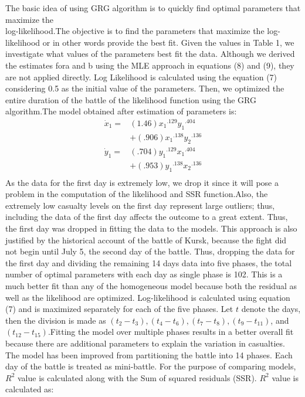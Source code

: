 \documentclass[]{article}
\begin{document}
The basic idea of using GRG algorithm is to quickly find optimal parameters that maximize the \\log-likelihood.The objective is to find the parameters that maximize the log-likelihood or in other words provide the best fit. Given the values in Table 1, we investigate what values of the parameters best fit the data. Although we derived the estimates fora and b using the MLE approach in equations (8) and (9), they are not applied directly. Log Likelihood is calculated using the equation (7) considering 0.5 as the initial value of the parameters. Then, we optimized the entire duration of the battle of the likelihood function using the GRG algorithm.The model obtained after estimation of parameters is:
\begin{equation}
\begin{split}
    \Dot{x}_1=&(1.46){x_1}^{.129}{y_1}^{.404} \\
     &+(.906){x_1}^{.138}{y_2}^{.136} \\
     \Dot{y}_1=&(.704){y_1}^{.129}{x_1}^{.404}\\
      &+(.953){y_1}^{.138}{x_2}^{.136}\\
\end{split}
\end{equation}
As the data for the first day is extremely low, we drop it since it will pose a problem in the computation of the likelihood and SSR function.Also, the extremely low casualty levels on the first day represent large outliers; thus, including the data of the first day affects the outcome to a great extent. Thus, the first day was dropped in fitting the data to the models. This approach is also justified by the historical account of the battle of Kursk, because the fight did not begin until July 5, the second day of the battle. Thus, dropping the data for the first day and dividing the remaining 14 days data into five phases, the total number of optimal parameters with each day as single phase is 102. This is a much better fit than any of the homogeneous model because both the residual as well as the likelihood are optimized. Log-likelihood is calculated using equation (7) and is maximized separately for each of the five phases. Let $t$ denote the days, then the division is made as $(t_2-t_3), (t_4-t_6), (t_7-t_8), (t_9-t_{11})$, and $(t_{12}-t_{15})$.Fitting the model over multiple phases results in a better overall fit because there are additional parameters to explain the variation in casualties. The model has been improved from partitioning the battle into 14 phases. Each day of the battle is treated as mini-battle. For the purpose of comparing models, $R^2$ value is calculated along with the Sum of squared residuals (SSR). $R^2$ value is calculated as: 
\end{document}
